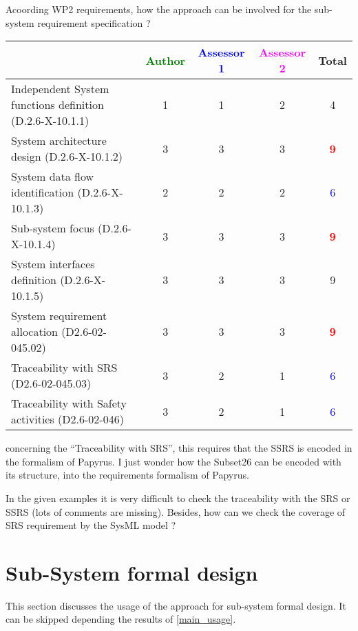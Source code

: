 Acoording WP2 requirements, how the approach can be involved for the sub-system requirement specification ?

\begin{tabular}{|l | c | c | c | c|}
\hline
& \textcolor{green}{Author} & \textcolor{blue}{Assessor 1} & \textcolor{magenta}{Assessor 2} & Total \\
\hline
Independent System functions definition (D.2.6-X-10.1.1) & 1    & 1    & 2    & 4    \\
\hline
System architecture design (D.2.6-X-10.1.2) & 3    & 3    & 3     & \textcolor{red}{\textbf{9}} \\
\hline
System data flow identification (D.2.6-X-10.1.3) & 2    & 2    & 2    & \textcolor{blue}{6} \\
\hline
Sub-system focus (D.2.6-X-10.1.4) & 3    & 3    & 3    & \textcolor{red}{\textbf{9}} \\
\hline
System interfaces definition (D.2.6-X-10.1.5) & 3    & 3    & 3    &  9\\
\hline
System requirement allocation (D2.6-02-045.02) & 3    & 3    & 3    & \textcolor{red}{\textbf{9}} \\
\hline
Traceability with SRS (D2.6-02-045.03) & 3    & 2    & 1    & \textcolor{blue}{6} \\
\hline
Traceability with Safety activities (D2.6-02-046) & 3    & 2    & 1    & \textcolor{blue}{6} \\
\hline
\end{tabular}

\begin{assessor1}
concerning the "`Traceability with SRS"', this requires that the SSRS is encoded in the formalism of Papyrus. I just wonder how the Subset26 can be encoded with its structure, into the requirements formalism of Papyrus. 
\end{assessor1}


\begin{assessor2}
In the given examples it is very difficult to check the traceability with the SRS or SSRS (lots of comments are missing). Besides, how can we check the coverage of SRS requirement by the SysML model ?
\end{assessor2}



\section{Sub-System formal design}
This section discusses the usage of the approach for sub-system formal design.
It can be skipped depending the results of \ref{main_usage}.


